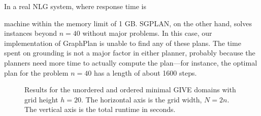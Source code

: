In a real NLG system, where response time is 

machine within the memory limit of 1 GB. SGPLAN, on the other hand, solves
instances beyond $n=40$ without major problems. In this case, our
implementation of GraphPlan is unable to find any of these plans. The time
spent on grounding is not a major factor in either planner, probably
because the planners need more time to actually compute the plan---for
instance, the optimal plan for the problem $n=40$ has a length of about
1600 steps.


\begin{figure}[t]
  \caption{Results for the unordered and ordered minimal GIVE domains with grid
  height $h=20$. The horizontal axis is the grid width, $N = 2n$. The
  vertical axis is the total runtime in seconds.}
  \label{fig:give-minimal}
\end{figure}

